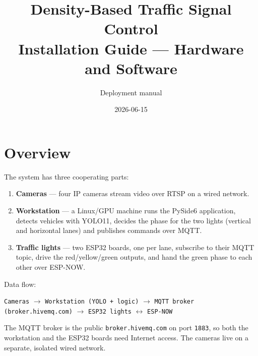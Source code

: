 \documentclass[11pt]{article}
\title{Density-Based Traffic Signal Control \\ \large Installation Guide --- Hardware and Software}
\author{Deployment manual}
\date{2026-06-15}
\newcommand{\code}[1]{\texttt{#1}}
\begin{document}
\maketitle

\tableofcontents
\bigskip

\section{Overview}
The system has three cooperating parts:

\begin{enumerate}[nosep]
  \item \textbf{Cameras} --- four IP cameras stream video over RTSP on a wired
        network.
  \item \textbf{Workstation} --- a Linux/GPU machine runs the PySide6
        application, detects vehicles with YOLO11, decides the phase for the
        two lights (vertical and horizontal lanes) and publishes commands over
        MQTT.
  \item \textbf{Traffic lights} --- two ESP32 boards, one per lane, subscribe to
        their MQTT topic, drive the red/yellow/green outputs, and hand the green
        phase to each other over ESP-NOW.
\end{enumerate}

\noindent Data flow:
\begin{center}
\code{Cameras} $\rightarrow$ \code{Workstation (YOLO + logic)} $\rightarrow$
\code{MQTT broker (broker.hivemq.com)} $\rightarrow$ \code{ESP32 lights}
$\leftrightarrow$ \code{ESP-NOW}
\end{center}

\noindent The MQTT broker is the public \code{broker.hivemq.com} on port
\code{1883}, so both the workstation and the ESP32 boards need Internet access.
The cameras live on a separate, isolated wired network.
\end{document}
